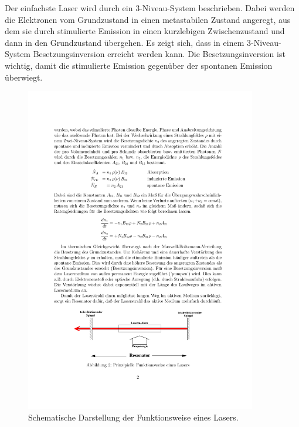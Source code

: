Der einfachste Laser wird durch ein 3-Niveau-System beschrieben. Dabei werden
die Elektronen vom Grundzustand in einen metastabilen Zustand angeregt, aus dem
sie durch stimulierte Emission in einen kurzlebigen Zwischenzustand und dann in
den Grundzustand übergehen. Es zeigt sich, dass in einem 3-Niveau-System
Besetzungsinversion erreicht werden kann. Die Besetzungsinversion ist wichtig,
damit die stimulierte Emission gegenüber der spontanen Emission überwiegt.

\begin{figure}[htb]
  \centering
  \includegraphics[width=0.9\textwidth]{figures/fig_Resonator.pdf}
  \caption{Schematische Darstellung der Funktionsweise eines Lasers. \cite{V61}}
  \label{fig:Resonator}
\end{figure}

